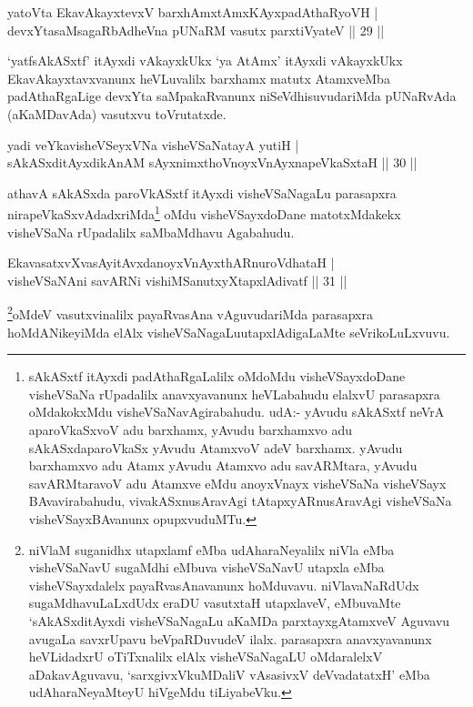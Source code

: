 \begin{shl}
yatoV\s ta EkavAkayxtevxV barxhAmxtAmxKAyxpadAthaRyoVH |\\
devxYtasaMsagaRbAdheVna pUNaRM vasutx parxtiVyateV \hfill || 29 ||
\end{shl}

\begin{artha}
`yatfsAkASxtf' itAyxdi vAkayxkUkx `ya AtAmx' itAyxdi vAkayxkUkx EkavAkayxtavxvanunx heVLuvalilx barxhamx 
matutx AtamxveMba padAthaRgaLige devxYta saMpakaRvanunx niSeVdhisuvudariMda pUNaRvAda (aKaMDavAda) vasutxvu 
toVrutatxde.
\end{artha}


\begin{shl}
yadi veYkavisheVSeyxVNa visheVSaNatayA yutiH |\\
sAkASxditAyxdikAnAM sAyxnimxthoV\s noyxVnAyxnapeVkaSxtaH \hfill || 30 ||
\end{shl}

\begin{artha}
athavA  sAkASxda paroVkASxtf itAyxdi visheVSaNagaLu parasapxra nirapeVkaSxvAdadxriMda\footnote{sAkASxtf itAyxdi padAthaRgaLalilx oMdoMdu visheVSayxdoDane visheVSaNa rUpadalilx anavxyavanunx heVLabahudu elalxvU parasapxra oMdakokxMdu visheVSaNavAgirabahudu. udA:- yAvudu sAkASxtf neVrA aparoVkaSxvoV adu barxhamx, yAvudu barxhamxvo adu sAkASxdaparoVkaSx yAvudu AtamxvoV adeV barxhamx. yAvudu barxhamxvo adu Atamx yAvudu Atamxvo adu savARMtara, yAvudu savARMtaravoV adu Atamxve eMdu anoyxVnayx visheVSaNa visheVSayx BAvavirabahudu, vivakASxnusAravAgi tAtapxyARnusAravAgi visheVSaNa visheVSayxBAvanunx opupxvuduMTu.} oMdu visheVSayxdoDane matotxMdakekx visheVSaNa rUpadalilx saMbaMdhavu Agabahudu.
\end{artha}


\begin{shl}
EkavasatxvXvasAyitAvxdanoyxVnAyxthARnuroVdhataH |\\
visheVSaNAni savARNi vishiMSanutxyXtapxlAdivatf \hfill || 31 ||
\end{shl}

\begin{artha}
\footnote{niVlaM suganidhx utapxlamf eMba udAharaNeyalilx niVla eMba visheVSaNavU sugaMdhi eMbuva visheVSaNavU utapxla eMba visheVSayxdalelx payaRvasAnavanunx hoMduvavu. niVlavaNaRdUdx sugaMdhavuLaLxdUdx eraDU vasutxtaH utapxlaveV, eMbuvaMte `sAkASxditAyxdi visheVSaNagaLu aKaMDa parxtayxgAtamxveV Aguvavu avugaLa savxrUpavu beVpaRDuvudeV ilalx. parasapxra anavxyavanunx heVLidadxrU oTiTxnalilx elAlx visheVSaNagaLU oMdaralelxV aDakavAguvavu, `sarxgivxVkuMDaliV vAsasivxV deVvadatatxH' eMba udAharaNeyaMteyU hiVgeMdu tiLiyabeVku.}oMdeV vasutxvinalilx payaRvasAna vAguvudariMda parasapxra hoMdANikeyiMda elAlx visheVSaNagaLu\footnotemark[\value{footnote}]utapxlAdigaLaMte seVrikoLuLxvuvu.
\end{artha}

